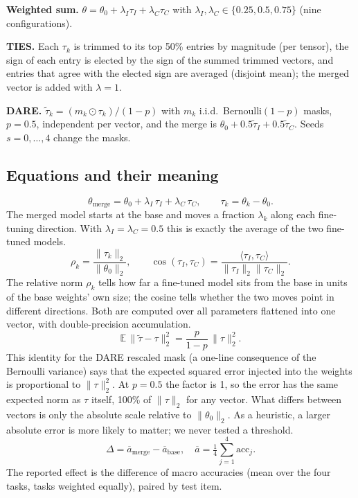 \documentclass[conference]{IEEEtran}
\begin{document}
\textbf{Weighted sum.} $\theta=\theta_0+\lambda_I\tau_I+\lambda_C\tau_C$ with $\lambda_I,\lambda_C\in\{0.25,0.5,0.75\}$ (nine configurations).

\textbf{TIES.} Each $\tau_k$ is trimmed to its top 50\% entries by magnitude (per tensor), the sign of each entry is elected by the sign of the summed trimmed vectors, and entries that agree with the elected sign are averaged (disjoint mean); the merged vector is added with $\lambda=1$.

\textbf{DARE.} $\tilde\tau_k=(m_k\odot\tau_k)/(1-p)$ with $m_k$ i.i.d.\ Bernoulli$(1-p)$ masks, $p=0.5$, independent per vector, and the merge is $\theta_0+0.5\tilde\tau_I+0.5\tilde\tau_C$. Seeds $s=0,\dots,4$ change the masks.

\subsection*{Equations and their meaning}
\begin{equation}
\theta_{\text{merge}}=\theta_0+\lambda_I\,\tau_I+\lambda_C\,\tau_C,\qquad \tau_k=\theta_k-\theta_0 .
\end{equation}
The merged model starts at the base and moves a fraction $\lambda_k$ along each fine-tuning direction. With $\lambda_I=\lambda_C=0.5$ this is exactly the average of the two fine-tuned models.
\begin{equation}
\rho_k=\frac{\lVert\tau_k\rVert_2}{\lVert\theta_0\rVert_2},\qquad
\cos(\tau_I,\tau_C)=\frac{\langle\tau_I,\tau_C\rangle}{\lVert\tau_I\rVert_2\lVert\tau_C\rVert_2}.
\end{equation}
The relative norm $\rho_k$ tells how far a fine-tuned model sits from the base in units of the base weights' own size; the cosine tells whether the two moves point in different directions. Both are computed over all parameters flattened into one vector, with double-precision accumulation.
\begin{equation}
\mathbb{E}\,\big\lVert\tilde\tau-\tau\big\rVert_2^2=\frac{p}{1-p}\,\lVert\tau\rVert_2^2 .
\end{equation}
This identity for the DARE rescaled mask (a one-line consequence of the Bernoulli variance) says that the expected squared error injected into the weights is proportional to $\lVert\tau\rVert_2^2$. At $p=0.5$ the factor is 1, so the error has the same expected norm as $\tau$ itself, 100\% of $\lVert\tau\rVert_2$ for any vector. What differs between vectors is only the absolute scale relative to $\lVert\theta_0\rVert_2$. As a heuristic, a larger absolute error is more likely to matter; we never tested a threshold.
\begin{equation}
\Delta=\overline{a}_{\text{merge}}-\overline{a}_{\text{base}},\quad \overline{a}=\tfrac14\sum_{j=1}^{4}\text{acc}_j .
\end{equation}
The reported effect is the difference of macro accuracies (mean over the four tasks, tasks weighted equally), paired by test item.
\end{document}
